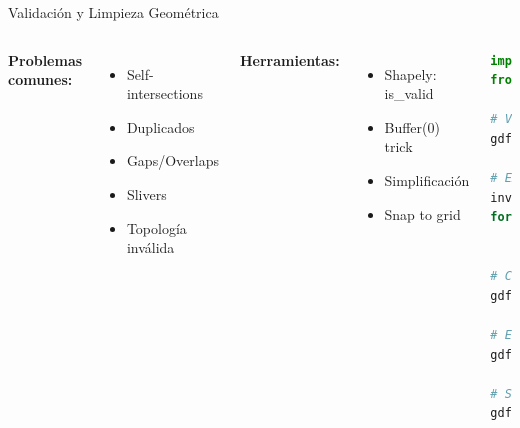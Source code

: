 \documentclass[10pt,aspectratio=169]{beamer}
\begin{document}
\begin{frame}[fragile]{Validación y Limpieza Geométrica}
    \begin{columns}[T]
        \footnotesize
        \textbf{Problemas comunes:}
        \begin{itemize}
            \item Self-intersections
            \item Duplicados
            \item Gaps/Overlaps
            \item Slivers
            \item Topología inválida
        \end{itemize}
        
        \textbf{Herramientas:}
        \begin{itemize}
            \item Shapely: is\_valid
            \item Buffer(0) trick
            \item Simplificación
            \item Snap to grid
        \end{itemize}
        
        \begin{lstlisting}[language=Python]
import geopandas as gpd
from shapely.validation import explain_validity

# Verificar validez
gdf['valido'] = gdf.geometry.is_valid

# Explicar problemas
invalidos = gdf[~gdf['valido']]
for idx, row in invalidos.iterrows():
    print(explain_validity(row.geometry))

# Corregir con buffer(0)
gdf['geometry'] = gdf.geometry.buffer(0)

# Eliminar slivers
gdf = gdf[gdf.geometry.area > 0.001]

# Simplificar
gdf['geometry'] = gdf.geometry.simplify(
    tolerance=1.0, preserve_topology=True)
        \end{lstlisting}
    \end{columns}
\end{frame}
\end{document}
